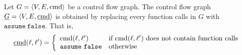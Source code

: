 
Let $G = \langle V, E, \textmd{cmd} \rangle$ be a control flow
graph. The control flow graph $\underline{G} = \langle V, E,
\underline{\textmd{cmd}} \rangle$ is obtained by replacing every
function calls in $G$ with $\mathtt{assume\ false}$. That is,
\begin{equation*}
  \underline{\textmd{cmd}} (\ell, \ell') =
  \left\{
    \begin{array}{ll}
      \textmd{cmd} (\ell, \ell') & 
      \textmd{if } \textmd{cmd} (\ell, \ell') 
      \textmd{ does not contain function calls}\\
      \mathtt{assume\ false} &
      \textmd{otherwise}
    \end{array}
  \right.
\end{equation*}